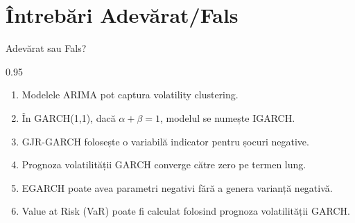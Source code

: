 \documentclass[9pt, aspectratio=169, t]{beamer}
\begin{document}
\section{Întrebări Adevărat/Fals}

\begin{frame}{Adevărat sau Fals?}
    \begin{cminipage}{0.95\textwidth}
    \begin{enumerate}\setlength{\itemsep}{0pt}
        \item Modelele ARIMA pot captura volatility clustering.

        \vspace{0.3cm}

        \item În GARCH(1,1), dacă $\alpha + \beta = 1$, modelul se numește IGARCH.

        \vspace{0.3cm}

        \item GJR-GARCH folosește o variabilă indicator pentru șocuri negative.

        \vspace{0.3cm}

        \item Prognoza volatilității GARCH converge către zero pe termen lung.

        \vspace{0.3cm}

        \item EGARCH poate avea parametri negativi fără a genera varianță negativă.

        \vspace{0.3cm}

        \item Value at Risk (VaR) poate fi calculat folosind prognoza volatilității GARCH.
    \end{enumerate}
    \end{cminipage}
\end{frame}
\end{document}
